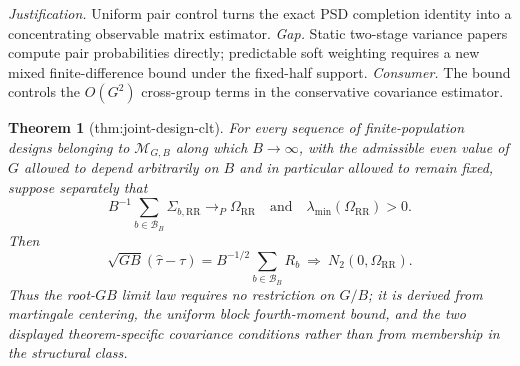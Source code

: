 \documentclass{article}
\newtheorem{theorem}{Theorem}
\begin{document}
\par\smallskip\noindent \textit{Justification.} Uniform pair control turns the exact PSD completion identity into a concentrating observable matrix estimator. \textit{Gap.} Static two-stage variance papers compute pair probabilities directly; predictable soft weighting requires a new mixed finite-difference bound under the fixed-half support. \textit{Consumer.} The bound controls the \(O(G^2)\) cross-group terms in the conservative covariance estimator.

\begin{theorem}[thm:joint-design-clt]\label{thm:joint-design-clt}
For every sequence of finite-population designs belonging to \(\mathcal M_{G,B}\) along which \(B\to\infty\), with the admissible even value of \(G\) allowed to depend arbitrarily on \(B\) and in particular allowed to remain fixed, suppose separately that
\[
B^{-1}\sum_{b\in\mathcal B_B}\Sigma_{b,\mathrm{RR}}\to_P\Omega_{\mathrm{RR}}
\quad\text{and}\quad
\lambda_{\min}(\Omega_{\mathrm{RR}})>0.
\]
Then
\[
\sqrt{GB}(\widehat\tau-\tau)=B^{-1/2}\sum_{b\in\mathcal B_B}R_b\ \Rightarrow\ N_2(0,\Omega_{\mathrm{RR}}).
\]
Thus the root-\(GB\) limit law requires no restriction on \(G/B\); it is derived from martingale centering, the uniform block fourth-moment bound, and the two displayed theorem-specific covariance conditions rather than from membership in the structural class.
\end{theorem}
\end{document}
